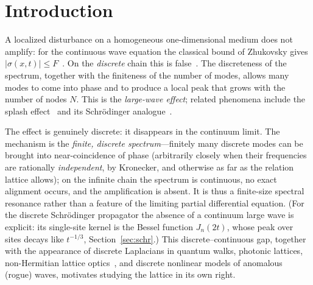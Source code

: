 \documentclass[11pt,reqno]{amsart}
\theoremstyle{plain}
\theoremstyle{definition}
\newcommand{\LN}{L_N}
\begin{document}
\begin{abstract}
on cycles, so $\limsup B_N/\sqrt N=1$; we show that it fails for every even $N\ge6$ (a Golay-pair obstruction) and, by exact certificates, for $N=15,21,27$, so the cycles $C_{21}$ and $C_{27}$ admit no uniform mixing, exact or $\varepsilon$-approximate. On the dispersive time scale $t=O(N)$ the constant is smaller and splits
by parity: numerically $c_0/\sqrt2$ for even $N$ and $\beta_{\mathrm{odd}}=0.928\ldots$ for odd $N$ (a
Bessel-envelope integral for which no elementary closed form was found). For the focusing discrete NLS the
linear large wave persists under weak nonlinearity, the modulational-instability band is read off the
$\LN$ spectrum, a single-site excitation cannot disperse above $\gamma P=4$, and localized breathers exist,
the site-centred one orbitally stable in the anti-continuum regime. Proved results are separated throughout
from computational evidence and conjectures; all quantitative claims are reproduced by the accompanying
scripts, with a \textsc{Gap}/\textsc{Pari}/\textsc{Julia}/\textsc{FriCAS}/\textsc{Rocq} exact-arithmetic layer.
\end{abstract}

\maketitle

\section{Introduction}

A localized disturbance on a homogeneous one-dimensional medium does not amplify: for the
continuous wave equation the classical bound of Zhukovsky gives $|\sigma(x,t)|\le F$~\cite{Zhukovsky}.
On the \emph{discrete} chain this is false~\cite{KMF,MF03,FM}. The discreteness of the spectrum, together
with the finiteness of the number of modes, allows many modes to come into phase and to produce a
local peak that grows with the number of nodes $N$. This is the \emph{large-wave effect}; related
phenomena include the splash effect~\cite{FMM} and its Schr\"odinger analogue~\cite{F23}.

The effect is genuinely discrete: it disappears in the continuum limit. The mechanism is the
\emph{finite, discrete spectrum}---finitely many discrete modes can be brought into near-coincidence of
phase (arbitrarily closely when their frequencies are rationally \emph{independent}, by Kronecker, and
otherwise as far as the relation lattice allows); on the infinite chain the spectrum is continuous, no exact
alignment occurs, and the amplification is absent. It is thus a finite-size spectral resonance rather than a
feature of the limiting partial differential equation. (For the discrete Schr\"odinger propagator the
absence of a continuum large wave is explicit: its single-site kernel is the Bessel function
$J_n(2t)$, whose peak over sites decays like $t^{-1/3}$, Section~\ref{sec:schr}.) This discrete--continuous gap,
together with the appearance of discrete Laplacians in quantum walks, photonic lattices, non-Hermitian
lattice optics~\cite{Longhi}, and discrete nonlinear models of anomalous (rogue) waves, motivates
studying the lattice in its own right.
\end{document}
